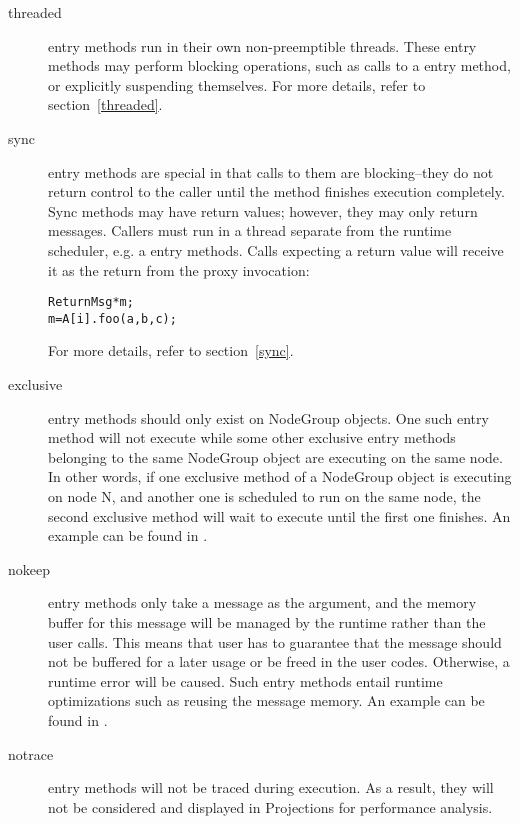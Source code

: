 \begin{description}
\item[threaded] entry methods 
run in their own non-preemptible threads. These
entry methods may perform blocking operations, such as calls to a
 entry method, or explicitly suspending themselves. For more
details, refer to section~\ref{threaded}.

\item[sync] entry methods are special in that
calls to them are blocking--they do not return control to the caller until the
method finishes execution completely. Sync methods may have return values;
however, they may only return messages. Callers must run in a thread separate
from the runtime scheduler, e.g. a  entry methods.  Calls
expecting a return value will receive it as the return from the proxy
invocation:
\begin{alltt}
 ReturnMsg* m;
 m = A[i].foo(a, b, c);
\end{alltt}
For more details, refer to section~\ref{sync}.

\item[exclusive]  entry methods should
only exist on NodeGroup objects. One such entry method will not execute while
some other exclusive entry methods belonging to the same NodeGroup object are
executing on the same node. In other words, if one exclusive method of a
NodeGroup object is executing on node N, and another one is scheduled to run on
the same node, the second exclusive method will wait to execute until the first
one finishes. An example can be found in .

\item[nokeep] entry methods only take a message as the argument,
and the memory buffer for this message will be managed by the \charmpp{}
runtime rather than the user calls. This means that user has to guarantee that
the message should not be buffered for a later usage or be freed in the user 
codes. Otherwise, a runtime error will be caused. 
Such entry methods entail runtime 
optimizations such as reusing the message memory. An example can be found in
.

\item[notrace] entry methods will not be traced during execution. As a result, they will not be considered and displayed in Projections for
performance analysis.


\end{description}
